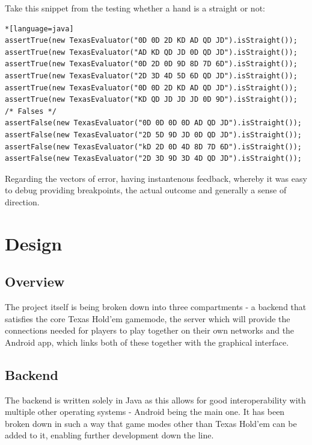 \documentclass[11pt]{article}
\begin{document}
Take this snippet from the testing whether a hand is a straight or not: 

\begin{lstlisting}*[language=java]
assertTrue(new TexasEvaluator("0D 0D 2D KD AD QD JD").isStraight());
assertTrue(new TexasEvaluator("AD KD QD JD 0D QD JD").isStraight());
assertTrue(new TexasEvaluator("0D 2D 0D 9D 8D 7D 6D").isStraight());
assertTrue(new TexasEvaluator("2D 3D 4D 5D 6D QD JD").isStraight());
assertTrue(new TexasEvaluator("0D 0D 2D KD AD QD JD").isStraight());
assertTrue(new TexasEvaluator("KD QD JD JD JD 0D 9D").isStraight());
/* Falses */
assertFalse(new TexasEvaluator("0D 0D 0D 0D AD QD JD").isStraight());
assertFalse(new TexasEvaluator("2D 5D 9D JD 0D QD JD").isStraight());
assertFalse(new TexasEvaluator("kD 2D 0D 4D 8D 7D 6D").isStraight());
assertFalse(new TexasEvaluator("2D 3D 9D 3D 4D QD JD").isStraight());
\end{lstlisting}

Regarding the vectors of error, having instantenous feedback, whereby it was easy to debug providing breakpoints, the actual outcome and generally a sense of direction.










\section*{Design}

\subsection*{Overview}

The project itself is being broken down into three compartments - a backend that satisfies the core Texas Hold'em gamemode, the server which will provide the connections needed for players to play together on their own networks and the Android app, which links both of these together with the graphical interface. 

\subsection*{Backend}

The backend is written solely in Java as this allows for good interoperability with multiple other operating systems - Android being the main one. It has been broken down in such a way that game modes other than Texas Hold'em can be added to it, enabling further development down the line. 
\end{document}
